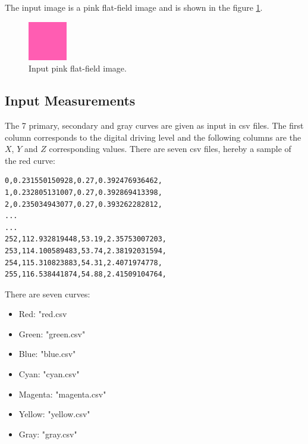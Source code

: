 The input image is a pink flat-field image and is shown in the figure \ref{fig:flatfieldRGB}.

\begin{figure}[!htb]
\begin{center}
\includegraphics[width=0.5\columnwidth]{./03_Rgb2XYZDisplayModule/images/pink.png}
\caption{Input pink flat-field image.}\label{fig:flatfieldRGB}
\end{center}
\end{figure}

\subsection{Input Measurements}

The 7 primary, secondary and gray curves are given as input in csv files. The first column corresponds to the digital driving level and the following columns are the $X$, $Y$ and $Z$ corresponding values. There are seven csv files, hereby a sample of the red curve:

\lstset{language=Scilab}
\begin{lstlisting}
0,0.231550150928,0.27,0.392476936462,
1,0.232805131007,0.27,0.392869413398,
2,0.235034943077,0.27,0.393262282812,
...
...
252,112.932819448,53.19,2.35753007203,
253,114.100589483,53.74,2.38192031594,
254,115.310823883,54.31,2.4071974778,
255,116.538441874,54.88,2.41509104764,
\end{lstlisting}

There are seven curves:
\begin{itemize}
\item Red: "red.csv
\item Green: "green.csv"
\item Blue: "blue.csv"
\item Cyan: "cyan.csv"
\item Magenta: "magenta.csv"
\item Yellow: "yellow.csv"
\item Gray: "gray.csv"
\end{itemize}

